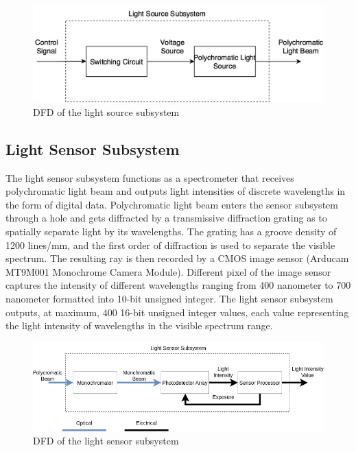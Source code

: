 \documentclass[conference]{IEEEtran}
\begin{document}
    \begin{figure}[htbp]
    \centerline{\includegraphics[scale=0.5]{light-source-dfd.png}}
    \caption{DFD of the light source subsystem}
    \label{light-source-dfd}
    \end{figure}

\subsection{Light Sensor Subsystem}
The light sensor subsystem functions as a spectrometer that receives polychromatic light beam and outputs light intensities of discrete wavelengths in the form of digital data.
Polychromatic light beam enters the sensor subsystem through a hole and gets diffracted by a transmissive diffraction grating as to spatially separate light by its wavelengths.
The grating has a groove density of 1200 lines/mm, and the first order of diffraction is used to separate the visible spectrum.
The resulting ray is then recorded by a CMOS image sensor (Arducam MT9M001 Monochrome Camera Module).
Different pixel of the image sensor captures the intensity of different wavelengths ranging from 400 nanometer to 700 nanometer formatted into 10-bit unsigned integer.
The light sensor subsystem outputs, at maximum, 400 16-bit unsigned integer values, each value representing the light intensity of wavelengths in the visible spectrum range. 

    \begin{figure}[htbp]
    \centerline{\includegraphics[scale=0.33]{light-sensor-dfd.png}}
    \caption{DFD of the light sensor subsystem}
    \label{light-sensor-dfd}
    \end{figure}
\end{document}
